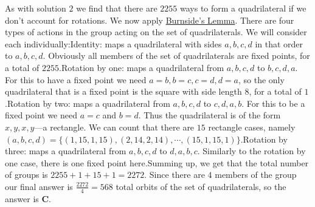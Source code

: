 \begin{enumerate}
As with solution $2$ we find that there are $2255$ ways to form a quadrilateral if we don't account for rotations. We now apply \href{https://artofproblemsolving.com/wiki/index.php?title=Burnside\%27s\_Lemma}{Burnside's Lemma}. There are four types of actions in the group acting on the set of quadrilaterals. We will consider each individually:Identity: maps a quadrilateral with sides $a,b,c,d$ in that order to $a,b,c,d$. Obviously all members of the set of quadrilaterals are fixed points, for a total of $2255$.Rotation by one: maps a quadrilateral from $a,b,c,d$ to $b,c,d,a$. For this to have a fixed point we need $a=b,b=c,c=d,d=a$, so the only quadrilateral that is a fixed point is the square with side length $8$, for a total of $1$.Rotation by two: maps a quadrilateral from $a,b,c,d$ to $c,d,a,b$. For this to be a fixed point we need $a=c$ and $b=d$. Thus the quadrilateral is of the form $x,y,x,y$—a rectangle. We can count that there are $15$ rectangle cases, namely $(a, b, c, d) = \{ (1, 15, 1, 15), (2, 14, 2, 14), \cdots, (15, 1, 15, 1)  \}$.Rotation by three: maps a quadrilateral from $a,b,c,d$ to $d,a,b,c$. Similarly to the rotation by one case, there is one fixed point here.Summing up, we get that the total number of groups is $2255+1+15+1=2272$. Since there are $4$ members of the group our final answer is $\frac{2272}{4}=\boxed{568}$ total orbits of the set of quadrilaterals, so the answer is $\boxed{\textbf{C}}$.

 


\end{enumerate}